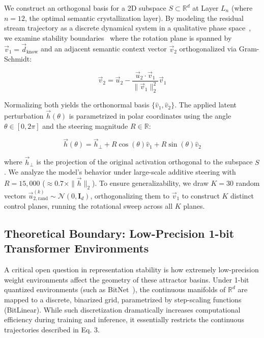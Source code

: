 \documentclass[10pt,journal,onecolumn]{article}
\begin{document}
We construct an orthogonal basis for a 2D subspace $S \subset \mathbb{R}^d$ at Layer $L_n$ (where $n = 12$, the optimal semantic crystallization layer). By modeling the residual stream trajectory as a discrete dynamical system in a qualitative phase space~\cite{poincare1899les}, we examine stability boundaries~\cite{lyapunov1892problem} where the rotation plane is spanned by $\vec{v}_1 = \vec{d}_{\text{know}}$ and an adjacent semantic context vector $\vec{v}_2$ orthogonalized via Gram-Schmidt:

\begin{equation}
\vec{v}_2 = \vec{u}_2 - \frac{\vec{u}_2 \cdot \vec{v}_1}{\|\vec{v}_1\|_2^2}\vec{v}_1
\label{eq:gram_schmidt_2}
\end{equation}

Normalizing both yields the orthonormal basis $\{\hat{v}_1, \hat{v}_2\}$. The applied latent perturbation $\vec{h}(\theta)$ is parametrized in polar coordinates using the angle $\theta \in [0, 2\pi]$ and the steering magnitude $R \in \mathbb{R}$:

\begin{equation}
\vec{h}(\theta) = \vec{h}_{\perp} + R \cos(\theta) \hat{v}_1 + R \sin(\theta) \hat{v}_2
\label{eq:perturbation_2}
\end{equation}

where $\vec{h}_{\perp}$ is the projection of the original activation orthogonal to the subspace $S$. We analyze the model's behavior under large-scale additive steering with $R = 15,000$ ($\approx 0.7 \times \|\vec{h}\|_2$). To ensure generalizability, we draw $K = 30$ random vectors $\vec{u}_{2,\text{rand}}^{(k)} \sim \mathcal{N}(0, \mathbf{I}_d)$, orthogonalizing them to $\vec{v}_1$ to construct $K$ distinct control planes, running the rotational sweep across all $K$ planes.

\subsection{Theoretical Boundary: Low-Precision 1-bit Transformer Environments}
\label{sec:bitnet_limitations}
A critical open question in representation stability is how extremely low-precision weight environments affect the geometry of these attractor basins. Under 1-bit quantized environments (such as BitNet~\cite{wang2023bitnet}), the continuous manifolds of $\mathbb{R}^d$ are mapped to a discrete, binarized grid, parametrized by step-scaling functions (BitLinear). While such discretization dramatically increases computational efficiency during training and inference, it essentially restricts the continuous trajectories described in Eq. 3. 
\end{document}
